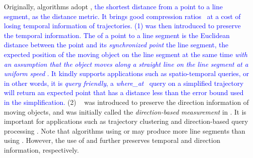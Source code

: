 Originally, \lsa algorithms adopt \ped, \textcolor{blue}{the shortest distance from a point to a line segment, as the distance metric. It brings good compression ratios~\cite{Douglas:Peucker, Hershberger:Speeding, Liu:BQS, Muckell:Compression, Chen:Trajectory, Cao:Spatio, Shi:Survey} at a cost of losing temporal information of trajectories.}
\textcolor{blue}{(1) \sed was then introduced to preserve the temporal information.
The \sed of a point to a line segment is the Euclidean distance between the point and its \emph{synchronized point} \wrt the line segment, the expected position of the moving object on the line segment at the same time \emph{with an assumption that the object moves along a straight line on the line segment at a uniform speed} \cite{Cao:Spatio}. It kindly supports applications such as spatio-temporal queries\cite{Meratnia:Spatiotemporal,Lin:Cised}, or in other words, it is \emph{query friendly}, \ie a \emph{where\_at}~\cite{Cao:Spatio} query on a simplified trajectory will return an expected point that has a distance less than the error bound used in the simplification.}
(2) \dad~\cite{Long:Direction, Zhang:Evaluation} was introduced to preserve the direction information of moving objects, and was initially called the \emph{direction-based measurement} in \cite{Long:Direction}. It is important for applications such as trajectory clustering and direction-based query processing \cite{Long:Direction,Long:Mining}.
%
Note that \lsa algorithms using \sed or \dad may produce more line segments than using \ped. However, the use of \sed and \dad further preserves temporal and direction information, respectively.



